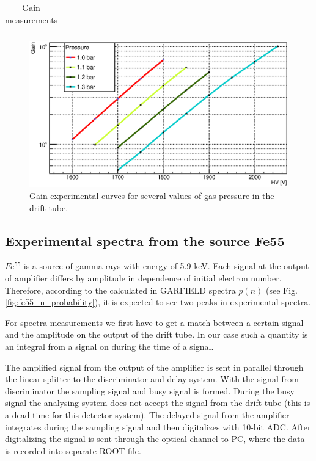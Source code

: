 \documentclass[12pt,a4paper]{article}
\begin{document}
\begin{table}[!h]
\begin{tabular}{|l|l|l|l|l|l|l|}
	\end{tabular}
	\caption{Gain measurements}
	\label{table:GainTotal}
	\end{table}
	
	\begin{figure}[!h]
	\centering
	\includegraphics[width=1.0\textwidth]{gain_multyGraph}
	\caption{Gain experimental curves for several values of gas pressure in the drift tube.}
	\label{fig:Gain_multy}
	\end{figure}
		
	
	\subsection{Experimental spectra from the source Fe55}
		
	$Fe^{55}$  is a source of gamma-rays with energy of 5.9 keV. Each signal at the output of amplifier differs by amplitude in dependence of initial electron number. Therefore, according to the calculated in GARFIELD spectra $p(n)$ (see Fig.\ref{fig:fe55_n_probability}), it is expected to see two peaks in experimental spectra.
	
	For spectra measurements we first have to get a match between a certain signal and the amplitude on the output of the drift tube. In our case such a quantity is an integral from a signal on during the time of a signal.
	
	The amplified signal from the output of the amplifier is sent in parallel through the linear splitter to the discriminator and delay system. With the signal from discriminator the sampling signal and busy signal is formed. During the busy signal the analysing system does not accept the signal from the drift tube (this is a dead time for this detector system). The delayed signal from the amplifier integrates during the sampling signal and then digitalizes with 10-bit ADC. After digitalizing the signal is sent through the optical channel to PC, where the data is recorded into separate ROOT-file.
	
\end{document}
